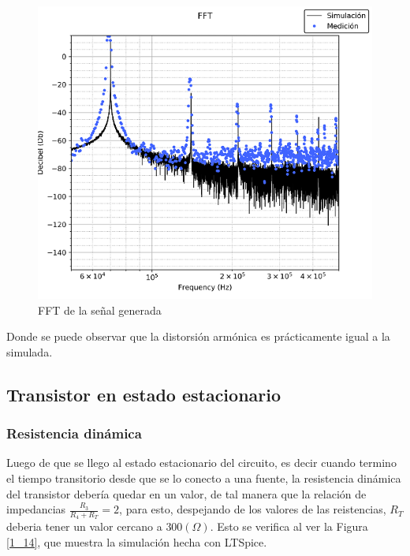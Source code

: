 \begin{figure}[H]
\begin{centering}
\includegraphics[scale=0.7]{../Ex1/Resources/FFT}
\par\end{centering}
\caption{FFT de la señal generada}
\label{1_13}

\end{figure}

Donde se puede observar que la distorsión armónica es prácticamente
igual a la simulada.

\subsection{Transistor en estado estacionario}

\subsubsection{Resistencia dinámica}

Luego de que se llego al estado estacionario del circuito, es decir
cuando termino el tiempo transitorio desde que se lo conecto a una
fuente, la resistencia dinámica del transistor debería quedar en un
valor, de tal manera que la relación de impedancias $\frac{R_{3}}{R_{4}+R_{T}}=2$,
para esto, despejando de los valores de las reistencias, $R_{T}$
deberia tener un valor cercano a $300(\Omega)$. Esto se verifica
al ver la Figura \ref{1_14}, que muestra la simulación hecha con
LTSpice.

